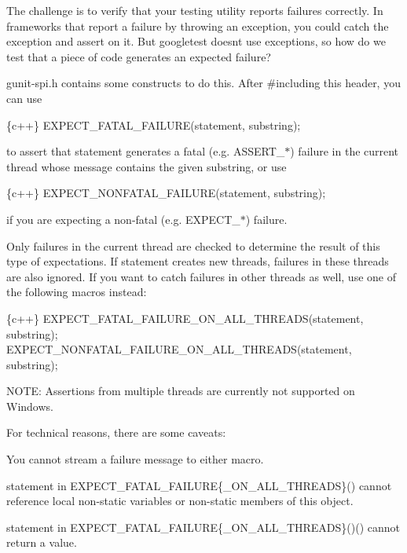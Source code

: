 The challenge is to verify that your testing utility reports failures correctly. In frameworks that report a failure by throwing an exception, you could catch the exception and assert on it. But googletest doesn\textquotesingle{}t use exceptions, so how do we test that a piece of code generates an expected failure?

gunit-\/spi.\+h contains some constructs to do this. After \#including this header, you can use


\begin{DoxyCode}
\{c++\}
  EXPECT\_FATAL\_FAILURE(statement, substring);
\end{DoxyCode}


to assert that {\ttfamily statement} generates a fatal (e.\+g. {\ttfamily A\+S\+S\+E\+R\+T\+\_\+$\ast$}) failure in the current thread whose message contains the given {\ttfamily substring}, or use


\begin{DoxyCode}
\{c++\}
  EXPECT\_NONFATAL\_FAILURE(statement, substring);
\end{DoxyCode}


if you are expecting a non-\/fatal (e.\+g. {\ttfamily E\+X\+P\+E\+C\+T\+\_\+$\ast$}) failure.

Only failures in the current thread are checked to determine the result of this type of expectations. If {\ttfamily statement} creates new threads, failures in these threads are also ignored. If you want to catch failures in other threads as well, use one of the following macros instead\+:


\begin{DoxyCode}
\{c++\}
  EXPECT\_FATAL\_FAILURE\_ON\_ALL\_THREADS(statement, substring);
  EXPECT\_NONFATAL\_FAILURE\_ON\_ALL\_THREADS(statement, substring);
\end{DoxyCode}


N\+O\+TE\+: Assertions from multiple threads are currently not supported on Windows.

For technical reasons, there are some caveats\+:


\begin{DoxyEnumerate}
\item You cannot stream a failure message to either macro.
\end{DoxyEnumerate}
\begin{DoxyEnumerate}
\item {\ttfamily statement} in {\ttfamily E\+X\+P\+E\+C\+T\+\_\+\+F\+A\+T\+A\+L\+\_\+\+F\+A\+I\+L\+U\+RE\{\+\_\+\+O\+N\+\_\+\+A\+L\+L\+\_\+\+T\+H\+R\+E\+A\+DS\}()} cannot reference local non-\/static variables or non-\/static members of {\ttfamily this} object.
\end{DoxyEnumerate}
\begin{DoxyEnumerate}
\item {\ttfamily statement} in {\ttfamily E\+X\+P\+E\+C\+T\+\_\+\+F\+A\+T\+A\+L\+\_\+\+F\+A\+I\+L\+U\+RE\{\+\_\+\+O\+N\+\_\+\+A\+L\+L\+\_\+\+T\+H\+R\+E\+A\+DS\}()()} cannot return a value.
\end{DoxyEnumerate}

